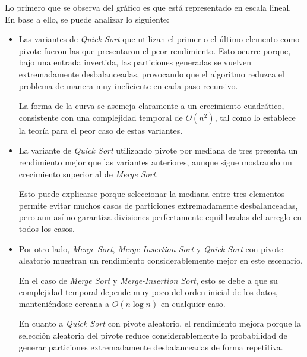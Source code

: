 Lo primero que se observa del gráfico es que está representado en escala lineal. \\

En base a ello, se puede analizar lo siguiente:





\begin{itemize}

    \item Las variantes de \textit{Quick Sort} que utilizan el primer o el último elemento como pivote fueron las que presentaron el peor rendimiento.  
          Esto ocurre porque, bajo una entrada invertida, las particiones generadas se vuelven extremadamente desbalanceadas, provocando que el algoritmo 
          reduzca el problema de manera muy ineficiente en cada paso recursivo.  

          La forma de la curva se asemeja claramente a un crecimiento cuadrático, consistente con una complejidad temporal de 
          $O(n^2)$, tal como lo establece la teoría para el peor caso de estas variantes.

    \item La variante de \textit{Quick Sort} utilizando pivote por mediana de tres presenta un rendimiento mejor que las variantes anteriores, aunque sigue 
          mostrando un crecimiento superior al de \textit{Merge Sort}.  

          Esto puede explicarse porque seleccionar la mediana entre tres elementos permite evitar muchos casos de particiones extremadamente 
          desbalanceadas, pero aun así no garantiza divisiones perfectamente equilibradas del arreglo en todos los casos.

    \item Por otro lado, \textit{Merge Sort}, \textit{Merge-Insertion Sort} y \textit{Quick Sort} con pivote aleatorio muestran un rendimiento 
          considerablemente mejor en este escenario.  

          En el caso de \textit{Merge Sort} y \textit{Merge-Insertion Sort}, esto se debe a que su complejidad temporal depende muy poco del orden 
          inicial de los datos, manteniéndose cercana a $O(n \log n)$ en cualquier caso.

          En cuanto a \textit{Quick Sort} con pivote aleatorio, el rendimiento mejora porque la selección aleatoria del pivote reduce considerablemente 
          la probabilidad de generar particiones extremadamente desbalanceadas de forma repetitiva.
\end{itemize}


